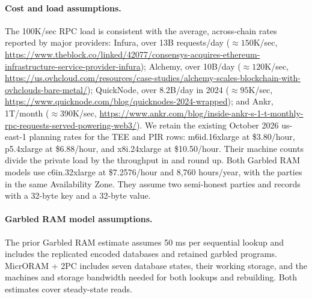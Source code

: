\begingroup
\footnotesize
\raggedright
\paragraph{Cost and load assumptions.}
The 100K/sec RPC load is consistent with the average, across-chain rates
reported by major providers: Infura, over 13B requests/day
(${\approx}150$K/sec, \url{https://www.theblock.co/linked/42077/consensys-acquires-ethereum-infrastructure-service-provider-infura});
Alchemy, over 10B/day (${\approx}120$K/sec,
\url{https://us.ovhcloud.com/resources/case-studies/alchemy-scales-blockchain-with-ovhclouds-bare-metal/});
QuickNode, over 8.2B/day in 2024 (${\approx}95$K/sec,
\url{https://www.quicknode.com/blog/quicknodes-2024-wrapped}); and Ankr,
1T/month (${\approx}390$K/sec,
\url{https://www.ankr.com/blog/inside-ankr-s-1-t-monthly-rpc-requests-served-powering-web3/}).
We retain the existing October 2026 us-east-1 planning rates for the TEE
and PIR rows: m6id.16xlarge at \$3.80/hour, p5.4xlarge at \$6.88/hour,
and x8i.24xlarge at \$10.50/hour. Their machine counts divide the private
load by the throughput in  and round up.
Both Garbled RAM models use c6in.32xlarge at \$7.2576/hour and 8,760
hours/year, with the parties in the same Availability Zone. They assume
two semi-honest parties and records with a 32-byte key and a 32-byte value.

\paragraph{Garbled RAM model assumptions.}
The prior Garbled RAM estimate assumes 50 ms per sequential lookup and
includes the replicated encoded databases and retained garbled programs.
MicrORAM + 2PC includes seven database states, their working storage, and
the machines and storage bandwidth needed for both lookups and rebuilding.
Both estimates cover steady-state reads.
\par\endgroup

